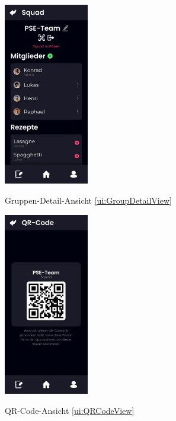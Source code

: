 \documentclass[parskip=full]{scrartcl}
\begin{document}
\begin{figure}[htp]
    \begin{minipage}
        [t]{0.49\textwidth}
        \centering
        \includegraphics[height=80mm]{images/ui/GroupDetailView.jpg}
        \label{fig:GroupDetailView}
        \caption{Gruppen-Detail-Ansicht \ref{ui:GroupDetailView}}
    \end{minipage}
    \begin{minipage}
        [t]{0.49\textwidth}
        \centering
        \includegraphics[height=80mm]{images/ui/QRCodeView.jpg}
        \label{fig:QRCodeView}
        \caption{QR-Code-Ansicht \ref{ui:QRCodeView}}
    \end{minipage}
\end{figure}
\newpage
\renewcommand{\thesubsection}{\arabic{section}.\arabic{subsection}}
\end{document}
